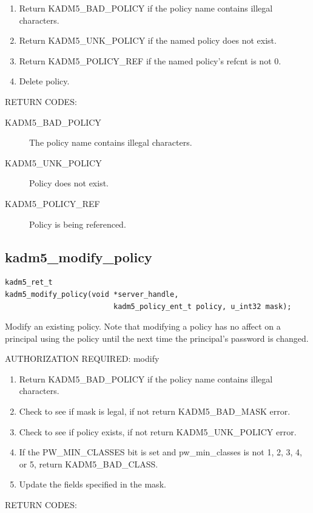 \begin{enumerate}
\item Return KADM5_BAD_POLICY if the policy name contains illegal
characters.
\item Return KADM5_UNK_POLICY if the named policy does not exist.
\item Return KADM5_POLICY_REF if the named policy's refcnt is not 0.
\item Delete policy.
\end{enumerate}

RETURN CODES:

\begin{description}
\item[KADM5_BAD_POLICY] The policy name contains illegal characters.
\item[KADM5_UNK_POLICY] Policy does not exist.
\item[KADM5_POLICY_REF] Policy is being referenced.
\end{description}

\subsection{kadm5_modify_policy}

\begin{verbatim}
kadm5_ret_t
kadm5_modify_policy(void *server_handle,
                         kadm5_policy_ent_t policy, u_int32 mask);
\end{verbatim}

Modify an existing policy.  Note that modifying a policy has no affect
on a principal using the policy until the next time the principal's
password is changed.

AUTHORIZATION REQUIRED: modify

\begin{enumerate}
\item Return KADM5_BAD_POLICY if the policy name contains illegal
characters.
\item Check to see if mask is legal, if not return KADM5_BAD_MASK error.
\item Check to see if policy exists, if not return
KADM5_UNK_POLICY error.
\item If the PW_MIN_CLASSES bit is set and pw_min_classes is not 1, 2,
3, 4, or 5, return KADM5_BAD_CLASS.
\item Update the fields specified in the mask.
\end{enumerate}

RETURN CODES:

